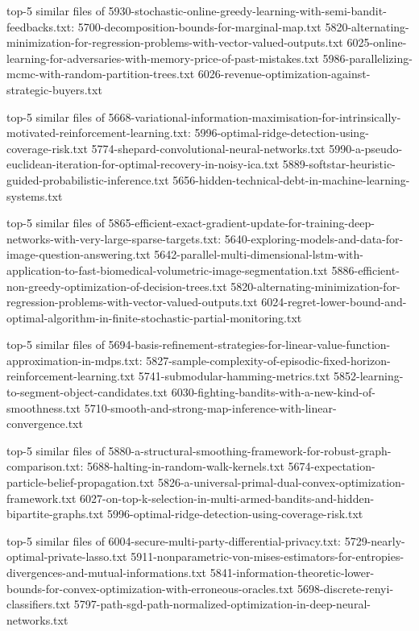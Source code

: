 \documentclass[11pt]{article}
\begin{document}
top-5 similar files of
5930-stochastic-online-greedy-learning-with-semi-bandit-feedbacks.txt:
5700-decomposition-bounds-for-marginal-map.txt
5820-alternating-minimization-for-regression-problems-with-vector-valued-outputs.txt
6025-online-learning-for-adversaries-with-memory-price-of-past-mistakes.txt
5986-parallelizing-mcmc-with-random-partition-trees.txt
6026-revenue-optimization-against-strategic-buyers.txt

top-5 similar files of
5668-variational-information-maximisation-for-intrinsically-motivated-reinforcement-learning.txt:
5996-optimal-ridge-detection-using-coverage-risk.txt
5774-shepard-convolutional-neural-networks.txt
5990-a-pseudo-euclidean-iteration-for-optimal-recovery-in-noisy-ica.txt
5889-softstar-heuristic-guided-probabilistic-inference.txt
5656-hidden-technical-debt-in-machine-learning-systems.txt

top-5 similar files of
5865-efficient-exact-gradient-update-for-training-deep-networks-with-very-large-sparse-targets.txt:
5640-exploring-models-and-data-for-image-question-answering.txt
5642-parallel-multi-dimensional-lstm-with-application-to-fast-biomedical-volumetric-image-segmentation.txt
5886-efficient-non-greedy-optimization-of-decision-trees.txt
5820-alternating-minimization-for-regression-problems-with-vector-valued-outputs.txt
6024-regret-lower-bound-and-optimal-algorithm-in-finite-stochastic-partial-monitoring.txt

top-5 similar files of
5694-basis-refinement-strategies-for-linear-value-function-approximation-in-mdps.txt:
5827-sample-complexity-of-episodic-fixed-horizon-reinforcement-learning.txt
5741-submodular-hamming-metrics.txt
5852-learning-to-segment-object-candidates.txt
6030-fighting-bandits-with-a-new-kind-of-smoothness.txt
5710-smooth-and-strong-map-inference-with-linear-convergence.txt

top-5 similar files of
5880-a-structural-smoothing-framework-for-robust-graph-comparison.txt:
5688-halting-in-random-walk-kernels.txt
5674-expectation-particle-belief-propagation.txt
5826-a-universal-primal-dual-convex-optimization-framework.txt
6027-on-top-k-selection-in-multi-armed-bandits-and-hidden-bipartite-graphs.txt
5996-optimal-ridge-detection-using-coverage-risk.txt

top-5 similar files of 6004-secure-multi-party-differential-privacy.txt:
5729-nearly-optimal-private-lasso.txt
5911-nonparametric-von-mises-estimators-for-entropies-divergences-and-mutual-informations.txt
5841-information-theoretic-lower-bounds-for-convex-optimization-with-erroneous-oracles.txt
5698-discrete-renyi-classifiers.txt
5797-path-sgd-path-normalized-optimization-in-deep-neural-networks.txt
\end{document}
